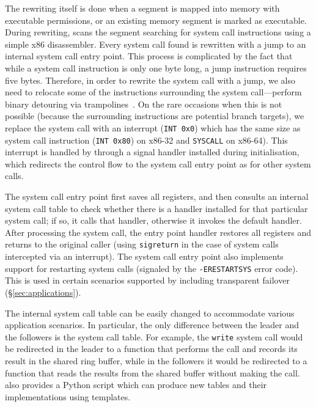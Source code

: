 The rewriting itself is done when a segment is mapped into memory with
executable permissions, or an existing memory segment is marked as
executable.  
During rewriting, \varan scans the segment searching for system call
instructions using a simple x86 disassembler.  Every system call found
is rewritten with a jump to an internal system call entry point. This
process is complicated by the fact that while a system call
instruction is only one byte long, a jump instruction requires five
bytes.  Therefore, in order to rewrite the system call with a jump, we
also need to relocate some of the instructions surrounding the system
call---\ie perform binary detouring via trampolines~\cite{detours}.
On the rare occasions when this is not possible (\eg because the
surrounding instructions are potential branch targets), we replace the
system call with an interrupt (\ie \lstinline`INT 0x0`) which has the
same size as system call instruction (\ie \lstinline`INT 0x80`) on
x86-32 and \lstinline`SYSCALL` on x86-64).  This interrupt is handled by
\varan through a signal handler installed during initialisation, which
redirects the control flow to the system call entry point as for other
system calls.

The system call entry point first saves all registers, and then
consults an internal system call table to check whether there is a
handler installed for that particular system call; if so, it calls
that handler, otherwise it invokes the default handler.  After
processing the system call, the entry point handler restores all
registers and returns to the original caller (using
\lstinline`sigreturn` in the case of system calls intercepted via an
interrupt). The system call entry point also implements support for
restarting system calls (\ie signaled by the \lstinline`-ERESTARTSYS`
error code). This is used in certain scenarios supported by \varan
including transparent failover (\S\ref{sec:applications}).

The internal system call table can be easily changed to accommodate
various application scenarios.  In particular, the only difference
between the leader and the followers is the system call table. For
example, the \lstinline`write` system call would be redirected in the leader
to a function that performs the call and records its result in the
shared ring buffer, while in the followers it would be redirected to a
function that reads the results from the shared buffer without making
the call.
\varan  also provides a Python script which can produce new tables
and their implementations using templates.

